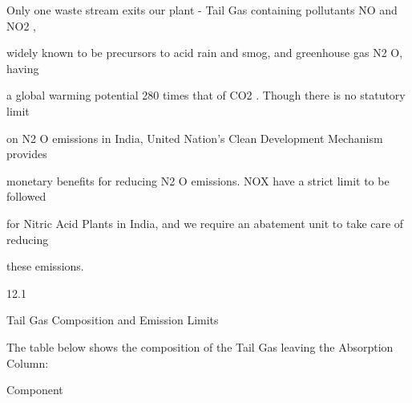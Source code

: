 \documentclass[a4paper,portrait,12pt]{article}
\begin{document}
\begin{flushleft}
Only one waste stream exits our plant - Tail Gas containing pollutants NO and NO2 ,
\end{flushleft}


\begin{flushleft}
widely known to be precursors to acid rain and smog, and greenhouse gas N2 O, having
\end{flushleft}


\begin{flushleft}
a global warming potential 280 times that of CO2 . Though there is no statutory limit
\end{flushleft}


\begin{flushleft}
on N2 O emissions in India, United Nation's Clean Development Mechanism provides
\end{flushleft}


\begin{flushleft}
monetary benefits for reducing N2 O emissions. NOX have a strict limit to be followed
\end{flushleft}


\begin{flushleft}
for Nitric Acid Plants in India, and we require an abatement unit to take care of reducing
\end{flushleft}


\begin{flushleft}
these emissions.
\end{flushleft}





12.1





\begin{flushleft}
Tail Gas Composition and Emission Limits
\end{flushleft}





\begin{flushleft}
The table below shows the composition of the Tail Gas leaving the Absorption Column:
\end{flushleft}


\begin{flushleft}
Component
\end{flushleft}
\end{document}

